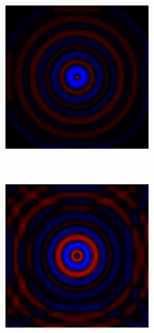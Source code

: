 \begin{figure}[p]
\bigskip
        \begin{subfigure}[b]{0.3\textwidth}
        \includegraphics[width=\textwidth]{include/graphics/image9}
    \end{subfigure}
    ~
    \begin{subfigure}[b]{0.3\textwidth}
        \includegraphics[width=\textwidth]{include/graphics/image10}

\end{subfigure}
\end{figure}
